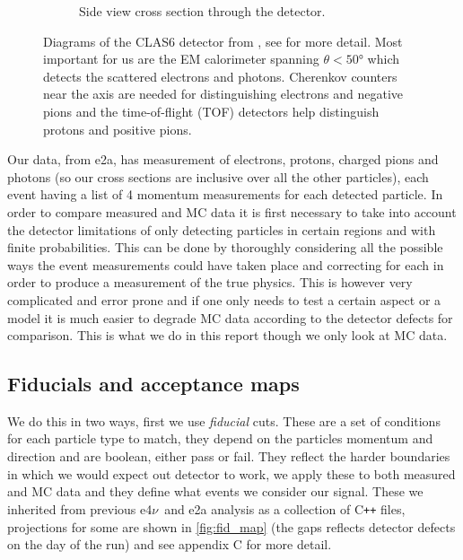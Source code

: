 \documentclass[a4paper,12pt]{article}
\newcommand{\efn}{e4$\nu$}
\begin{document}
\begin{figure}[H]
\begin{subfigure}[b]{0.5\textwidth}
        \caption{Side view cross section through the detector.}
    \end{subfigure}
    \caption{\label{fig:CLAS}
        Diagrams of the CLAS6 detector from \cite{meckingCEBAFLargeAcceptance2003}, see for more detail.
        Most important for us are the EM calorimeter spanning $\theta < 50\si{\degree}$ which detects the scattered electrons and photons.
        Cherenkov counters near the axis are needed for distinguishing electrons and negative pions and the time-of-flight (TOF) detectors help distinguish protons and positive pions.
    }
\end{figure}

Our data, from e2a, has measurement of electrons, protons, charged pions and photons (so our cross sections are inclusive over all the other particles), each event having a list of 4 momentum measurements for each detected particle.
In order to compare measured and MC data it is first necessary to take into account the detector limitations of only detecting particles in certain regions and with finite probabilities.
This can be done by thoroughly considering all the possible ways the event measurements could have taken place and correcting for each in order to produce a measurement of the true physics.
This is however very complicated and error prone and if one only needs to test a certain aspect or a model it is much easier to degrade MC data according to the detector defects for comparison.
This is what we do in this report though we only look at MC data.

\subsection{Fiducials and acceptance maps}
We do this in two ways, first we use \emph{fiducial} cuts.
These are a set of conditions for each particle type to match, they depend on the particles momentum and direction and are boolean, either pass or fail.
They reflect the harder boundaries in which we would expect out detector to work, we apply these to both measured and MC data and they define what events we consider our signal.
These we inherited from previous \efn\ and e2a analysis as a collection of C\texttt{++} files, projections for some are shown in \cref{fig:fid_map} (the gaps reflects detector defects on the day of the run) and see \cite{mclauchlanDeltaElectroproduction12C} appendix C for more detail.
\end{document}

